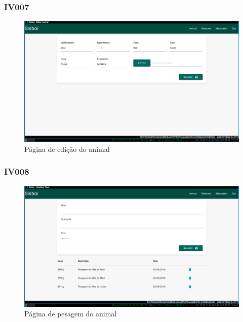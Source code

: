 \documentclass[12pt]{article}
\begin{document}
\begin{titlepage}
\begin{figure}[!h]
\begin{center}

		\end{center}
	\end{figure}

	\newpage

	\subsubsection{IV007}

	\begin{figure}[!h]
		\begin{center}
			\caption{Página de edição do animal}
			\includegraphics[width=13cm]{img/prototipos/editar.png}


		\end{center}
	\end{figure}


	\subsubsection{IV008}

	\begin{figure}[!h]
		\begin{center}
			\caption{Página de pesagem do animal}
			\includegraphics[width=13cm]{img/prototipos/peso.png}


\end{center}
\end{figure}
\end{titlepage}
\end{document}
